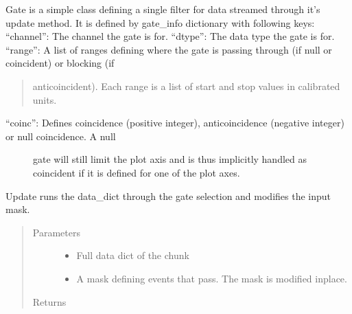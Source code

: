 \documentclass[letterpaper,10pt,english]{sphinxmanual}
\begin{document}
\begin{fulllineitems}
\label{\detokenize{autodocs/plot:listmode.plot.Gate}}
\sphinxAtStartPar
Gate is a simple class defining a single filter for data streamed through it’s update method. It is defined by
gate\_info dictionary with following keys:
“channel”:  The channel the gate is for.
“dtype”:     The data type the gate is for.
“range”:    A list of ranges defining where the gate is passing through (if null or coincident) or blocking (if
\begin{quote}

\sphinxAtStartPar
anticoincident). Each range is a list of start and stop values in calibrated units.
\end{quote}
\begin{description}
\item[{“coinc”:    Defines coincidence (positive integer), anticoincidence (negative integer) or null coincidence. A null}] \leavevmode
\sphinxAtStartPar
gate will still limit the plot axis and is thus implicitly handled as coincident if it is defined for
one of the plot axes.

\end{description}

\begin{fulllineitems}
\label{\detokenize{autodocs/plot:listmode.plot.Gate.update}}
\sphinxAtStartPar
Update runs the data\_dict through the gate selection and modifies the input mask.
\begin{quote}\begin{description}
\item[{Parameters}] \leavevmode\begin{itemize}
\item {} 
\sphinxAtStartPar
{} \textendash{} Full data dict of the chunk

\item {} 
\sphinxAtStartPar
{} \textendash{} A mask defining events that pass. The mask is modified in\sphinxhyphen{}place.

\end{itemize}

\item[{Returns}] \leavevmode
\sphinxAtStartPar


\end{description}\end{quote}

\end{fulllineitems}


\end{fulllineitems}
\end{document}
